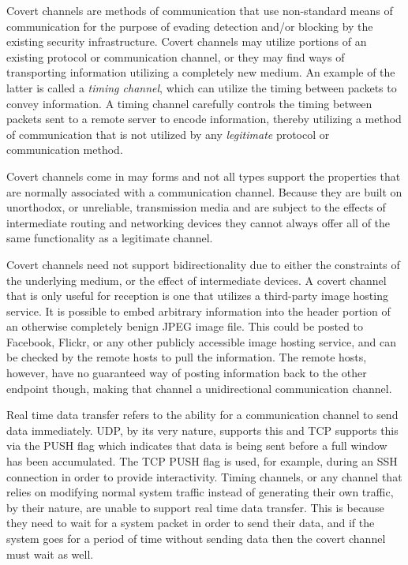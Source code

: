 \documentclass{article}
\theoremstyle{remark}
\theoremstyle{definition}
\theoremstyle{definition}
\theoremstyle{definition}
\begin{document}
Covert channels are methods of communication that use non-standard means of
communication for the purpose of evading detection and/or blocking by the
existing security infrastructure. Covert channels may utilize
portions of an existing protocol or communication channel, or they may find
ways of transporting information utilizing a completely new medium. An example
of the latter is called a \emph{timing channel}, which can utilize the timing
between packets to convey information. A timing channel carefully controls the
timing between packets sent to a remote server to encode information, thereby
utilizing a method of communication that is not utilized by any
\emph{legitimate} protocol or communication method.

Covert channels come in may forms and not all types support the properties that
are normally associated with a communication channel. Because they are built on
unorthodox, or unreliable, transmission media and are subject to the effects of
intermediate routing and networking devices they cannot always offer all of the
same functionality as a legitimate channel.

Covert channels need not support bidirectionality due
to either the constraints of the underlying medium, or the effect of
intermediate devices. A covert channel that is only useful for reception is one
that utilizes a third-party image hosting service. It is possible to embed
arbitrary information into the header portion of an otherwise completely benign
JPEG image file. This could be posted to Facebook, Flickr, or any other
publicly accessible image hosting service, and can be checked by the remote
hosts to pull the information. The remote hosts, however, have no guaranteed
way of posting information back to the other endpoint though, making that
channel a unidirectional communication channel.

Real time data transfer refers to the ability
for a communication channel to send data immediately. UDP, by its very nature,
supports this and TCP supports this via the PUSH flag which indicates that data
is being sent before a full window has been accumulated. The TCP PUSH flag
is used, for example, during an SSH connection in order to provide
interactivity. Timing channels, or any channel that relies on modifying normal
system traffic instead of generating their own traffic, by their nature, are
unable to support real time data transfer. This is because they need to wait for
a system packet in order to send their data, and if the system goes for a period
of time without sending data then the covert channel must wait as well.
\end{document}
